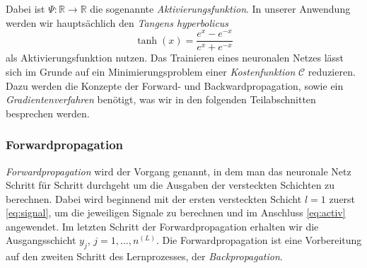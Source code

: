 Dabei ist $\Psi: \mathbb{R} \rightarrow \mathbb{R}$ die sogenannte \textit{Aktivierungsfunktion}. In unserer Anwendung
werden wir hauptsächlich den \textit{Tangens hyperbolicus}
\[
    \tanh(x)=\frac{e^x - e^{-x}}{e^x + e^{-x}}
\]
als Aktivierungsfunktion nutzen. Das Trainieren eines neuronalen Netzes lässt sich im Grunde auf ein Minimierungsproblem
einer \textit{Kostenfunktion} $\mathcal{C}$
reduzieren. Dazu werden die Konzepte der Forward- und Backwardpropagation, sowie ein \textit{Gradientenverfahren}
benötigt, was wir in den folgenden Teilabschnitten besprechen werden.

\subsubsection{Forwardpropagation}
{\em Forwardpropagation} wird der Vorgang genannt, in dem man das neuronale Netz Schritt für Schritt durchgeht um die
Ausgaben der versteckten Schichten zu berechnen. Dabei wird beginnend mit der ersten versteckten Schicht  $l = 1$
zuerst \eqref{eq:signal}, um die jeweiligen Signale zu berechnen und im Anschluss \eqref{eq:activ} angewendet.
Im letzten Schritt der Forwardpropagation erhalten wir die Ausgangsschicht $y_{j}$, $j = 1 ,\dots, n^{(L)}$.
Die Forwardpropagation ist eine Vorbereitung auf den zweiten Schritt des Lernprozesses, der \textit{Backpropagation}.

